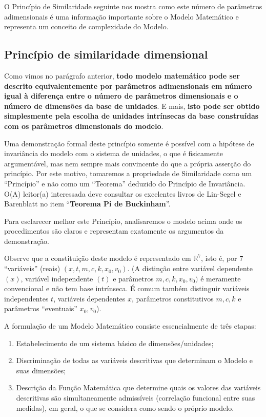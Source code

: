    O Princípio de Similaridade seguinte nos mostra como este número de parâmetros adimensionais é uma informação importante sobre o Modelo Matemático e representa um conceito de complexidade do Modelo.


\subsection{Princípio de similaridade dimensional}

    Como vimos no parágrafo anterior, \textbf{todo modelo matemático pode ser descrito equivalentemente por parâmetros adimensionais em número igual à diferença entre o número de parâmetros dimensionais e o número de dimensões da base de unidades}. E mais, \textbf{isto pode ser obtido simplesmente pela escolha de unidades intrínsecas da base construídas com os parâmetros dimensionais do modelo}.

    Uma demonstração formal deste princípio somente é possível com a hipótese de invariância do modelo com o sistema de unidades, o que é fisicamente argumentável, mas nem sempre mais convincente do que a própria asserção do princípio. Por este motivo, tomaremos a propriedade de Similaridade como um ``Princípio'' e não como um ``Teorema'' deduzido do Princípio de Invariância. O(A) leitor(a) interessada deve consultar os excelentes livros de Lin-Segel e Barenblatt no item ``\textbf{Teorema Pi de Buckinham}''.

    Para esclarecer melhor este Princípio, analisaremos o modelo acima onde os procedimentos são claros e representam exatamente os argumentos da demonstração.

    Observe que a constituição deste modelo é representado em \(\mathbb{R}^7\), isto é, por \(7\) ``variáveis'' (reais) \((x, t, m, c, k, x_0, v_0)\). (A distinção entre variável dependente \((x)\), variável independente \((t)\) e parâmetros \(m, c, k, x_0, v_0)\) é meramente convencional e não tem base intrínseca. É comum também distinguir variáveis independentes \(t\), variáveis dependentes \(x\), parâmetros constitutivos \(m, c, k\) e parâmetros ``eventuais'' \(x_0, v_0\)).

    A formulação de um Modelo Matemático consiste essencialmente de três etapas:

    \begin{enumerate}
    \item Estabelecimento de um sistema básico de dimensões/unidades;
    \item Discriminação de todas as variáveis descritivas que determinam o Modelo e suas dimensões;
    \item Descrição da Função Matemática que determine quais os valores das variáveis descritivas são simultaneamente admissíveis (correlação funcional entre suas medidas), em geral, o que se considera como sendo o próprio modelo.
    \end{enumerate}

